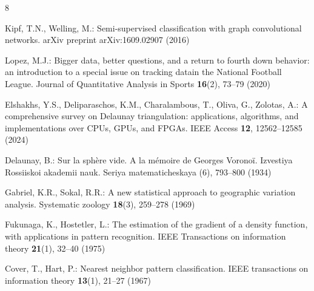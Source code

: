 \documentclass[runningheads]{llncs}
\begin{document}
\begin{thebibliography}{8}

Kipf, T.N., Welling, M.: Semi-supervised classification with graph convolutional networks. arXiv preprint arXiv:1609.02907 (2016)


Lopez, M.J.: Bigger data, better questions, and a return to fourth down behavior: an introduction to a special issue on tracking datain the National Football League. Journal of Quantitative Analysis in Sports \textbf{16}(2), 73--79 (2020)

Elshakhs, Y.S., Deliparaschos, K.M., Charalambous, T., Oliva, G., Zolotas, A.: A comprehensive survey on Delaunay triangulation: applications, algorithms, and implementations over CPUs, GPUs, and FPGAs. IEEE Access \textbf{12}, 12562--12585 (2024)

Delaunay, B.: Sur la sphère vide. A la mémoire de Georges Voronoï. Izvestiya Rossiiskoi akademii nauk. Seriya matematicheskaya (6), 793--800 (1934)

Gabriel, K.R., Sokal, R.R.: A new statistical approach to geographic variation analysis. Systematic zoology \textbf{18}(3), 259--278 (1969)


Fukunaga, K., Hostetler, L.: The estimation of the gradient of a density function, with applications in pattern recognition. IEEE Transactions on information theory \textbf{21}(1), 32--40 (1975)

Cover, T., Hart, P.: Nearest neighbor pattern classification. IEEE transactions on information theory \textbf{13}(1), 21--27 (1967)




\end{thebibliography}
\end{document}
